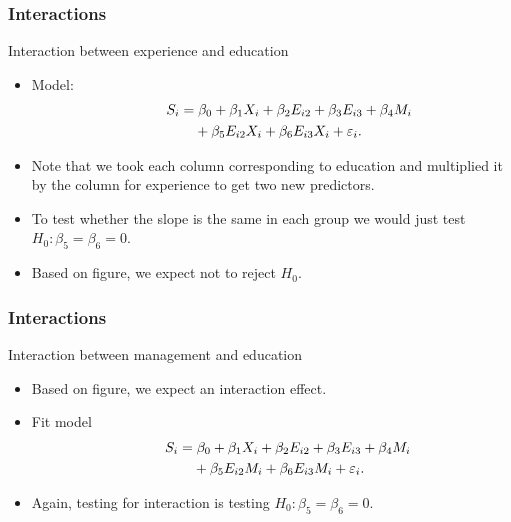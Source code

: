 \documentclass[handout]{beamer}
\begin{document}
   \begin{frame} \frametitle{Interactions}

   \begin{block}
   {Interaction between experience and education}
   \begin{itemize}[<+->]

   \item Model:
   $$
   \begin{aligned}
   \lefteqn{S_i = \beta_0 + \beta_1 X_i + \beta_2 E_{i2} + \beta_3 E_{i3} + \beta_4 M_i} \\
   & \qquad  + \beta_5 E_{i2} X_i + \beta_6 E_{i3} X_i + \varepsilon_i.
   \end{aligned}
   $$
   \item Note that we took each column corresponding to education and multiplied it by the column for experience to get two new predictors.
   \item To test whether the slope is the same in each group we would just test
   $H_0:\beta_5 = \beta_6=0$.

   \item Based on figure, we expect not to reject $H_0$.
   \end{itemize}
   \end{block}
   \end{frame}


   \begin{frame} \frametitle{Interactions}

   \begin{block}
   {Interaction between management and education}
   \begin{itemize}[<+->]

   \item Based on figure, we expect an interaction effect.

   \item Fit model
   $$
   \begin{aligned}
   \lefteqn{S_i = \beta_0 + \beta_1 X_i + \beta_2 E_{i2} + \beta_3 E_{i3} + \beta_4 M_i} \\
   & \qquad  + \beta_5 E_{i2} M_i + \beta_6 E_{i3} M_i + \varepsilon_i.
   \end{aligned}
   $$

   \item Again, testing for interaction is testing $H_0:\beta_5=\beta_6=0.$
   \end{itemize}
   \end{block}
   \end{frame}
\end{document}
